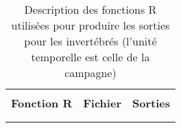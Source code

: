 \documentclass{article}
\begin{document}

\newpage
\begin{landscape}
\thispagestyle{empty}

\begin{table}
\caption{\label{allo} Description des fonctions R utilisées pour produire les
  sorties pour les invertébrés (l'unité temporelle est celle de la campagne)}
\begin{center}
\begin{tabular}{l l l}
\scriptsize
\\
\textbf{Fonction R} & \textbf{Fichier} & \textbf{Sorties} \\
\\
\hline
\hline
\\


\end{tabular}
\end{center}
\end{table}
\end{landscape}
\end{document}
